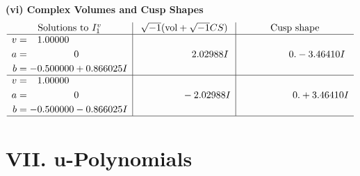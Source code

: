 \documentclass[1p]{elsarticle_modified}
\theoremstyle{definition}
\newcommand{\I}{\sqrt{-1}}
\begin{document}
\newpage\flushleft \textbf{(vi) Complex Volumes and Cusp Shapes}
$$\begin{array}{c|c|c}  
\text{Solutions to }I^v_{1}& \I (\text{vol} + \sqrt{-1}CS) & \text{Cusp shape}\\
 \hline 
\begin{aligned}
v &= \phantom{-}1.00000\phantom{ +0.000000I} \\
a &= \phantom{-0.000000 } 0 \\
b &= -0.500000 + 0.866025 I\end{aligned}
 & \phantom{-0.000000 -}2.02988 I & \phantom{-0.000000 } 0. - 3.46410 I \\ \hline\begin{aligned}
v &= \phantom{-}1.00000\phantom{ +0.000000I} \\
a &= \phantom{-0.000000 } 0 \\
b &= -0.500000 - 0.866025 I\end{aligned}
 & \phantom{-0.000000 } -2.02988 I & \phantom{-0.000000 -}0. + 3.46410 I\\
 \hline 
 \end{array}$$\newpage
\newpage\renewcommand{\arraystretch}{1}
\centering \section*{ VII. u-Polynomials}
\end{document}
